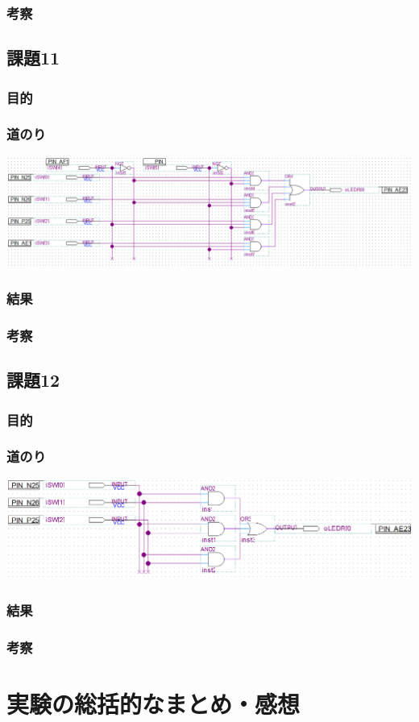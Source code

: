 \documentclass[a4paper]{jarticle}
\begin{document}
\subsubsection{考察}
\subsection{課題11}
\subsubsection{目的}
\subsubsection{道のり}
\begin{center}
	\includegraphics[width=15cm]{work11.PNG}
\end{center}
\subsubsection{結果}
\subsubsection{考察}
\subsection{課題12}
\subsubsection{目的}
\subsubsection{道のり}
\begin{center}
	\includegraphics[width=15cm]{work12.PNG}
\end{center}
\subsubsection{結果}
\subsubsection{考察}
\section{実験の総括的なまとめ・感想}
\end{document}

